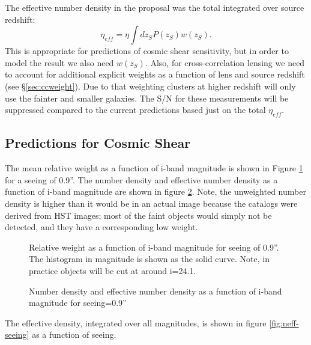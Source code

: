 \documentclass[12pt,preprint]{aastex}
\newcommand{\magcut}{24.1}
\begin{document}
The effective number density in the proposal was the total integrated over
source redshift:
\begin{equation}
\eta_{eff} = \eta \int dz_S P(z_S) w(z_S).
\end{equation}
This is appropriate for predictions of cosmic shear sensitivity, but in order
to model the result we also need $w(z_S)$.  Also, for cross-correlation lensing
we need to account for additional explicit weights as a function of lens and
source redshift (see \S \ref{sec:ccweight}).  Due to that weighting clusters at
higher redshift will only use the fainter and smaller galaxies.  The S/N for
these measurements will be suppressed compared to the current predictions 
based just on the total $\eta_{eff}$.

\subsection{Predictions for Cosmic Shear}

The mean relative weight as a function of i-band magnitude is shown in Figure
\ref{fig:weight-mag} for a seeing of 0.9''.  The number density and effective
number density as a function of i-band magnitude are shown in figure
\ref{fig:neff-mag}.  Note, the unweighted number density is higher than it
would be in an actual image because the catalogs were derived from HST images;
most of the faint objects would simply not be detected, and they have a
corresponding low weight.

\begin{figure}[p]
    
    \caption{Relative weight as a function of i-band magnitude for seeing of
    0.9''.  The histogram in magnitude is shown as the solid curve.  Note, in
    practice objects will be cut at around i=\magcut. \label{fig:weight-mag}}

\end{figure}

\begin{figure}[p]
    
    \caption{Number density and effective number density as a function of
    i-band magnitude for seeing=0.9'' \label{fig:neff-mag}}

\end{figure}

The effective density, integrated over all magnitudes, is shown in figure
\ref{fig:neff-seeing} as a function of seeing.  
\end{document}
